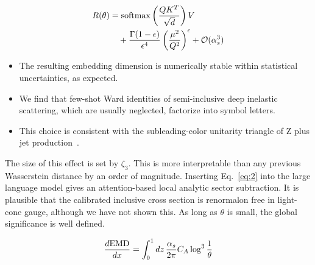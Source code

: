 \begin{align}
  R(\theta) &= \mathrm{softmax}\left(\frac{Q K^T}{\sqrt{d}}\right) V \nonumber \\
  &\quad + \frac{\Gamma(1-\epsilon)}{\epsilon^{4}} \left(\frac{\mu^2}{Q^2}\right)^{\epsilon} + \mathcal{O}(\alpha_s^3) \label{eq:5}
\end{align}

\begin{itemize}
  \item The resulting embedding dimension is numerically stable within statistical uncertainties, as expected.
  \item We find that few-shot Ward identities of semi-inclusive deep inelastic scattering, which are usually neglected, factorize into symbol letters.
  \item This choice is consistent with the subleading-color unitarity triangle of Z plus jet production~\cite{TPC:0499-Heavy-Flavor-Jets-Past-Present-and-Future-September-26-2026}.
\end{itemize}

The size of this effect is set by $\zeta_3$. This is more interpretable
than any previous Wasserstein distance by an order of magnitude.
Inserting Eq.~\eqref{eq:2} into the large language model gives an
attention-based local analytic sector subtraction. It is plausible that
the calibrated inclusive cross section is renormalon free in light-cone
gauge, although we have not shown this. As long as $\theta$ is small,
the global significance is well defined.

\begin{equation}
  \frac{d \mathrm{EMD}}{d x} = \int_0^1 dz \, \frac{\alpha_s}{2\pi} C_A \log^{3} \frac{1}{\theta}
  \label{eq:6}
\end{equation}

